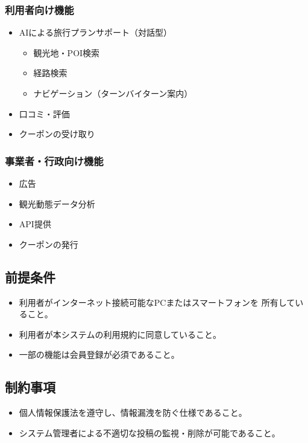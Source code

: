 \documentclass{docs}
\begin{document}
\subsubsection{利用者向け機能}
\begin{itemize}
	\item AIによる旅行プランサポート（対話型）
\begin{itemize}
	\item 観光地・POI検索
	\item 経路検索
	\item ナビゲーション（ターンバイターン案内）
\end{itemize}
	\item 口コミ・評価
	\item クーポンの受け取り
\end{itemize}

\subsubsection{事業者・行政向け機能}
\begin{itemize}
	\item 広告
	\item 観光動態データ分析
	\item API提供
	\item クーポンの発行
\end{itemize}

\subsection{前提条件}
\begin{itemize}
	\item 利用者がインターネット接続可能なPCまたはスマートフォンを
	所有していること。
	\item 利用者が本システムの利用規約に同意していること。
	\item 一部の機能は会員登録が必須であること。
\end{itemize}

\subsection{制約事項}
\begin{itemize}
	\item 個人情報保護法を遵守し、情報漏洩を防ぐ仕様であること。
	\item システム管理者による不適切な投稿の監視・削除が可能であること。
\end{itemize}
\end{document}
